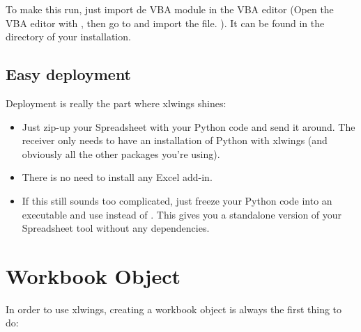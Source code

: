 \documentclass[letterpaper,11pt,english]{sphinxmanual}
\begin{document}
To make this run, just import de VBA module  in the VBA editor (Open the VBA editor with ,
then go to  and import the  file. ). It can be found in the directory of
your  installation.


\section{Easy deployment}
\label{quickstart:easy-deployment}
Deployment is really the part where xlwings shines:
\begin{itemize}
\item {} 
Just zip-up your Spreadsheet with your Python code and send it around. The receiver only needs to have an
installation of Python with xlwings (and obviously all the other packages you're using).

\item {} 
There is no need to install any Excel add-in.

\item {} 
If this still sounds too complicated, just freeze your Python code into an executable and use
 instead of . This gives you a standalone version of your Spreadsheet tool without any
dependencies.

\end{itemize}


\chapter{Workbook Object}
\label{workbook:workbook-object}\label{workbook::doc}
In order to use xlwings, creating a workbook object is always the first thing to do:
\label{workbook:module-xlwings}
\end{document}
